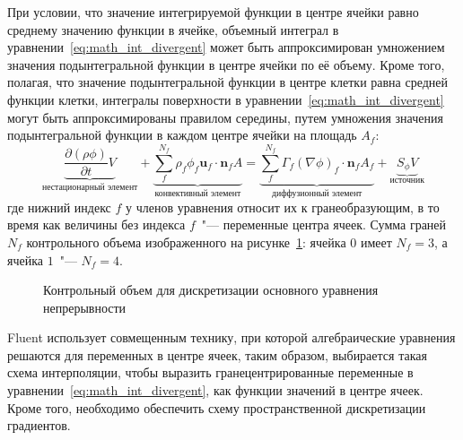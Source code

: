 При условии, что значение интегрируемой функции в центре ячейки равно среднему значению функции в ячейке, объемный интеграл в уравнении~\eqref{eq:math_int_divergent} может быть аппроксимирован умножением значения подынтегральной функции в центре ячейки по её объему.
Кроме того, полагая, что значение подынтегральной функции в центре клетки равна средней функции клетки, интегралы поверхности в уравнении~\eqref{eq:math_int_divergent} могут быть аппроксимированы правилом середины,
путем умножения значения подынтегральной функции в каждом центре ячейки на
площадь \(A_{f}\): 
\begin{equation}
\underbrace{\frac{\partial \left(\rho \phi \right)}{\partial t}V}_{\text{нестационарный~элемент}}+ \underbrace{\sum _{f}^{{N}_{f}} \rho_{f} \phi_{f} \boldsymbol u_{f}\cdot \boldsymbol n_{f}A}_{\text{конвективный~элемент}}= \underbrace{\sum _{f}^{{N}_{f}}\Gamma_{f} \left(\nabla \phi\right)_{f} \cdot \boldsymbol n_{f}A_{f}}_{\text{диффузионный~элемент}}+\underbrace{S _{\phi}V}_{\text{источник}}
\end{equation}
где нижний индекс \(f\) у членов уравнения относит их к гранеобразующим, в то время как величины без индекса \(f\)~"--- переменные
центра ячеек. 
Сумма граней \(N_{f}\) контрольного объема изображенного на рисунке~\ref{fig:math_control_volume}: ячейка \(0\) имеет \(N_{f}=3\), а ячейка \(1\)~"---
 \(N_{f} = 4\). 
\begin{figure}
\centering

\caption{Контрольный объем для дискретизации основного уравнения непрерывности}\label{fig:math_control_volume}
\end{figure}
Fluent использует совмещенным технику, при которой алгебраические уравнения решаются для переменных в центре ячеек, таким образом, выбирается такая схема интерполяции, чтобы выразить гранецентрированные переменные в уравнении~\eqref{eq:math_int_divergent}, как функции значений в центре ячеек. 
Кроме того, необходимо обеспечить схему пространственной дискретизации
градиентов. 
